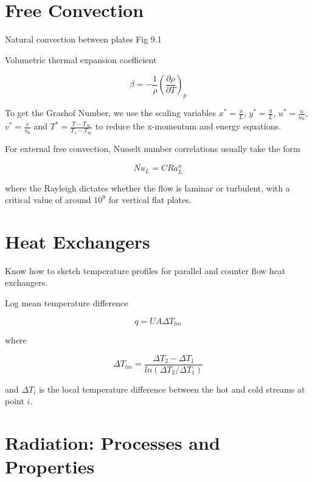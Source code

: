 \documentclass[paper=letter, fontsize=11pt]{scrartcl}
\numberwithin{equation}{section}        %
\numberwithin{figure}{section}          %
\numberwithin{table}{section}               %
\begin{document}
\section{Free Convection}

Natural convection between plates Fig 9.1

Volumetric thermal expansion coefficient 

\begin{equation}
\beta = -\frac{1}{\rho}\left(\frac{\partial\rho}{\partial T}\right)_p
\end{equation}

To get the Grashof Number, we use the scaling variables $x^\ast = \frac{x}{L}$, $y^\ast = \frac{y}{L}$, $u^\ast = \frac{u}{u_0}$, $v^\ast = \frac{v}{u_0}$ and $T^\ast = \frac{T-T_\infty}{T_s-T_\infty}$ to reduce the x-momentum and energy equations.

For external free convection, Nusselt number correlations usually take the form

\begin{equation}
\overline{Nu}_L = C Ra_L^n
\end{equation}

\noindent where the Rayleigh dictates whether the flow is laminar or turbulent, with a critical value of around $10^9$ for vertical flat plates.
    

\section{Heat Exchangers}

Know how to sketch temperature profiles for parallel and counter flow heat exchangers.

Log mean temperature difference 

\begin{equation}
q = UA\Delta T_{lm}
\end{equation}

\noindent where

\begin{equation}
\Delta T_{lm} = \frac{\Delta T_2 - \Delta T_1}{ln(\Delta T_2 / \Delta T_1)}
\end{equation}

\noindent and $\Delta T_i$ is the local temperature difference between the hot and cold streams at point $i$.


\section{Radiation: Processes and Properties}
\end{document}
